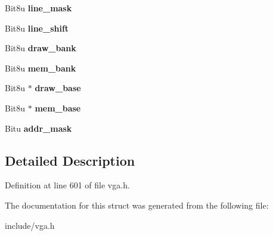 \begin{DoxyCompactItemize}
\item 
\hypertarget{structVGA__TANDY_ac11ab0eacb74d36a4a3dd6aaf37a686f}{Bit8u {\bfseries line\-\_\-mask}}\label{structVGA__TANDY_ac11ab0eacb74d36a4a3dd6aaf37a686f}

\item 
\hypertarget{structVGA__TANDY_ae12c0fcf6c249e111c6234f01b8cf248}{Bit8u {\bfseries line\-\_\-shift}}\label{structVGA__TANDY_ae12c0fcf6c249e111c6234f01b8cf248}

\item 
\hypertarget{structVGA__TANDY_a5b6d47ade55349d0a33eb63e54395287}{Bit8u {\bfseries draw\-\_\-bank}}\label{structVGA__TANDY_a5b6d47ade55349d0a33eb63e54395287}

\item 
\hypertarget{structVGA__TANDY_a7387ac0d3b061d599ce1afe53910beef}{Bit8u {\bfseries mem\-\_\-bank}}\label{structVGA__TANDY_a7387ac0d3b061d599ce1afe53910beef}

\item 
\hypertarget{structVGA__TANDY_a3e2211caf88d83cc8288bed2fa5fa0af}{Bit8u $\ast$ {\bfseries draw\-\_\-base}}\label{structVGA__TANDY_a3e2211caf88d83cc8288bed2fa5fa0af}

\item 
\hypertarget{structVGA__TANDY_a5e9ff0bd5345f4fb3e7e9e6e5bd2ccad}{Bit8u $\ast$ {\bfseries mem\-\_\-base}}\label{structVGA__TANDY_a5e9ff0bd5345f4fb3e7e9e6e5bd2ccad}

\item 
\hypertarget{structVGA__TANDY_a844355a014b601bccd7728ccc140935e}{Bitu {\bfseries addr\-\_\-mask}}\label{structVGA__TANDY_a844355a014b601bccd7728ccc140935e}

\end{DoxyCompactItemize}


\subsection{Detailed Description}


Definition at line 601 of file vga.\-h.



The documentation for this struct was generated from the following file\-:\begin{DoxyCompactItemize}
\item 
include/vga.\-h\end{DoxyCompactItemize}
